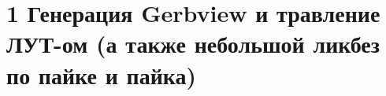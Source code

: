 \chapter{1 Генерация Gerbview и травление ЛУТ-ом (а также небольшой ликбез по пайке и пайка)}\label{kicad:etching}
